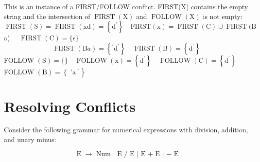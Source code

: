 \documentclass[a4paper]{exam}
\begin{document}
\begin{solution}
This is an instance of a FIRST/FOLLOW conflict. FIRST(X) contains the empty string and the intersection of $\operatorname{FIRST}(\mathrm{X})$ and $\operatorname{FOLLOW}(\mathrm{X})$ is not empty:
$\operatorname{FIRST}(\mathrm{S})=\operatorname{FIRST}(\mathrm{x} \mathrm{d})=\left\{\mathrm{d}^{\prime}\right\} \quad \mathrm{FIRST}(\mathrm{x})=\operatorname{FIRST}(\mathrm{C}) \cup \operatorname{FIRST}(\mathrm{B}$ a) $\quad \operatorname{FIRST}(\mathrm{C})=\{\epsilon\}$
$$
\operatorname{FIRST}(\mathrm{B} a)=\left\{{ }^{\prime} \mathrm{d}^{\prime}\right\} \quad \operatorname{FIRST}(\mathrm{B})=\left\{\mathrm{d}^{\prime}\right\}
$$
FOLLOW $(\mathrm{S})=\{\} \quad \operatorname{FOLLOW}(\mathrm{x})=\left\{\mathrm{d}^{\prime}\right\} \quad \operatorname{FOLLOW}(\mathrm{C})=\left\{\mathrm{d}^{\prime}\right\} \quad$ FOLLOW $(\mathrm{B})=\left\{\right.$ 'a $\left.^{\prime}\right\}$
\end{solution}


\section{Resolving Conflicts}
Consider the following grammar for numerical expressions with division, addition, and
unary minus:

$$\text{ E } → \text{ Num } |\text{ E / E } | \text{ E + E } | \text{ − E}$$
\end{document}
